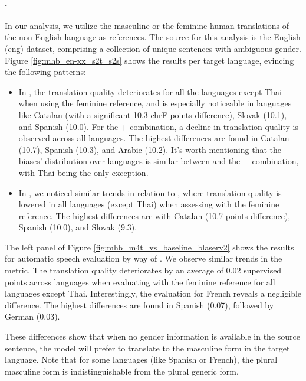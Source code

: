 \paragraph{\engx.} In our analysis, we utilize the masculine or the feminine human translations of the non-English language as references. The source for this analysis is the English (eng) \multilingualholisticbias dataset, comprising a collection of unique sentences with ambiguous gender. %
Figure \ref{fig:mhb_en-xx_s2t_s2s} shows the results per target language, evincing the following patterns:

\begin{itemize}
    \item In \mfourtlg \st, the translation quality deteriorates for all the languages except Thai when using the feminine reference, and is especially noticeable in languages like Catalan (with a significant 10.3 chrF points difference), Slovak (10.1), and Spanish (10.0). For the \whisperlarge + \nllbmedium combination, a decline in translation quality is observed across all languages. The highest differences are found in Catalan (10.7), Spanish (10.3), and Arabic (10.2). It's worth mentioning that the biases' distribution over languages is similar between \mfourtlg and the \whisperlarge + \nllbmedium combination, with Thai being the only exception. 
\item In \sst, we noticed similar trends in relation to \st, where translation quality is lowered in all languages (except Thai) when assessing with the feminine reference. The highest differences are with Catalan (10.7 \asrchrf points difference), Spanish (10.0), and Slovak (9.3). %

\end{itemize}


The left panel of Figure \ref{fig:mhb_m4t_vs_baseline_blaserv2} shows the results for automatic speech evaluation by way of \blaser. We observe similar trends in the \asrchrf metric. The translation quality deteriorates by an average of 0.02 supervised \blaser points across languages when evaluating with the feminine reference for all languages except Thai. Interestingly, the evaluation for French reveals a negligible difference. The highest differences are found in Spanish (0.07), followed by German (0.03).

These differences show that when no gender information is available in the source sentence, the model will prefer to translate to the masculine form in the target language. Note that for some languages (like Spanish or French), the plural masculine form is indistinguishable from the plural generic form.

